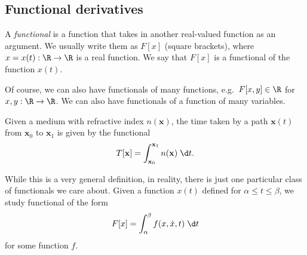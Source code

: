 \documentclass[a4paper]{article}
\begin{document}
\subsection{Functional derivatives}
\begin{defi}[Functional]
  A \emph{functional} is a function that takes in another real-valued function as an argument. We usually write them as $F[x]$ (square brackets), where $x = x(t): \R \to \R$ is a real function. We say that $F[x]$ is a functional of the function $x(t)$.
\end{defi}
Of course, we can also have functionals of many functions, e.g.\ $F[x, y]\in \R$ for $x, y: \R \to \R$. We can also have functionals of a function of many variables.

\begin{eg}
  Given a medium with refractive index $n(\mathbf{x})$, the time taken by a path $\mathbf{x}(t)$ from $\mathbf{x}_0$ to $\mathbf{x}_1$ is given by the functional
  \[
    T[\mathbf{x}] = \int_{\mathbf{x}_0}^{\mathbf{x}_1} n(\mathbf{x}) \;\d t.
  \]
\end{eg}

While this is a very general definition, in reality, there is just one particular class of functionals we care about. Given a function $x(t)$ defined for $\alpha \leq t \leq \beta$, we study functional of the form
\[
  F[x] = \int_\alpha^\beta f(x, \dot{x}, t)\;\d t
\]
for some function $f$.
\end{document}
